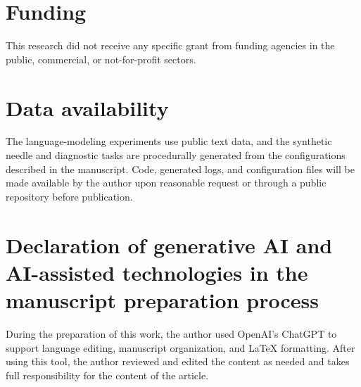 \documentclass[preprint,12pt]{elsarticle}
\begin{document}
\section*{Funding}
This research did not receive any specific grant from funding agencies in the public, commercial, or not-for-profit sectors.

\section*{Data availability}
The language-modeling experiments use public text data, and the synthetic needle and diagnostic tasks are procedurally generated from the configurations described in the manuscript. Code, generated logs, and configuration files will be made available by the author upon reasonable request or through a public repository before publication.

\section*{Declaration of generative AI and AI-assisted technologies in the manuscript preparation process}
During the preparation of this work, the author used OpenAI's ChatGPT to support language editing, manuscript organization, and LaTeX formatting. After using this tool, the author reviewed and edited the content as needed and takes full responsibility for the content of the article.
\end{document}
